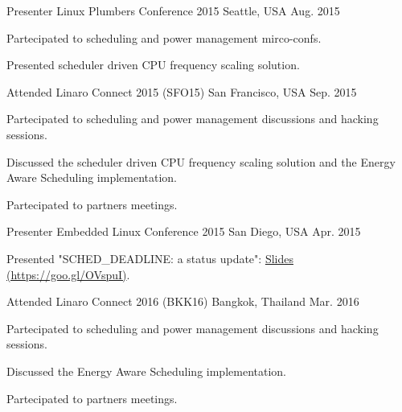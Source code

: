 \begin{cventries}
  \cventry
    {Presenter} %
    {Linux Plumbers Conference 2015} %
    {Seattle, USA} %
    {Aug. 2015} %
    {
      \begin{cvitems} %
        \item {Partecipated to scheduling and power management mirco-confs.}
        \item {Presented scheduler driven CPU frequency scaling solution.}
      \end{cvitems}
    }

  \cventry
    {Attended} %
    {Linaro Connect 2015 (SFO15)} %
    {San Francisco, USA} %
    {Sep. 2015} %
    {
      \begin{cvitems} %
        \item {Partecipated to scheduling and power management discussions and
		hacking sessions.}
        \item {Discussed the scheduler driven CPU frequency scaling solution and
		the Energy Aware Scheduling implementation.}
        \item {Partecipated to partners meetings.}
      \end{cvitems}
    }

  \cventry
    {Presenter} %
    {Embedded Linux Conference 2015} %
    {San Diego, USA} %
    {Apr. 2015} %
    {
      \begin{cvitems} %
        \item {Presented "SCHED\_DEADLINE: a status update":
	       \href{http://events.linuxfoundation.org/sites/events/files/slides/SCHED_DEADLINE-20160404.pdf}{Slides (https://goo.gl/OVspuI)}.}
      \end{cvitems}
    }

  \cventry
    {Attended} %
    {Linaro Connect 2016 (BKK16)} %
    {Bangkok, Thailand} %
    {Mar. 2016} %
    {
      \begin{cvitems} %
        \item {Partecipated to scheduling and power management discussions and
		hacking sessions.}
        \item {Discussed the Energy Aware Scheduling implementation.}
        \item {Partecipated to partners meetings.}
      \end{cvitems}
    }


\end{cventries}
